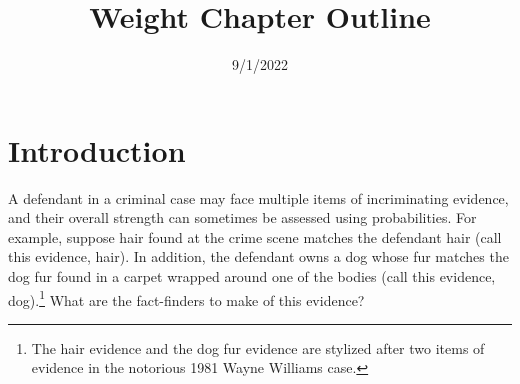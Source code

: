 \documentclass[
  10pt,
  dvipsnames,enabledeprecatedfontcommands]{scrartcl}
\title{Weight Chapter Outline}
\author{}
\date{\vspace{-2.5em}9/1/2022}
\begin{document}
\maketitle

{
\hypersetup{linkcolor=}
\setcounter{tocdepth}{2}
\tableofcontents
}
\hypertarget{introduction}{%
\section{Introduction}\label{introduction}}

A defendant in a criminal case may face multiple items of incriminating
evidence, and their overall strength can sometimes be assessed using
probabilities. For example, suppose hair found at the crime scene
matches the defendant hair (call this evidence, \textsf{hair}). In
addition, the defendant owns a dog whose fur matches the dog fur found
in a carpet wrapped around one of the bodies (call this evidence,
\textsf{dog}).\footnote{The hair evidence and the dog fur evidence are
  stylized after two items of evidence in the notorious 1981 Wayne
  Williams case.}
What are the fact-finders to make of this evidence?
\end{document}
